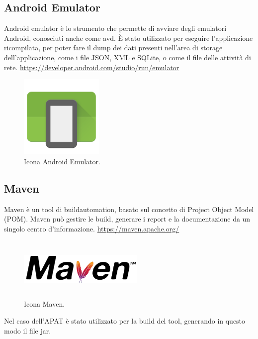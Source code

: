 \subsection*{Android Emulator}
Android emulator è lo strumento che permette di avviare degli emulatori Android, conosciuti anche come \gls{avd}.
È stato utilizzato per eseguire l'applicazione ricompilata, per poter fare il dump dei dati presenti nell'area di storage dell'applicazione, come i file JSON, XML e SQLite, o come il file delle attività di rete.
\url{https://developer.android.com/studio/run/emulator}
\begin{figure}[H]
    \centering
    \includegraphics[width=4cm, height=4cm]{./immagini/emulator.png}
    \caption{Icona Android Emulator.}\label{fig:emulator}
\end{figure}

\subsection*{Maven}
Maven è un tool di \gls{buildautomation}, basato sul concetto di Project Object Model (POM). Maven può gestire le build, generare i report e la documentazione da un singolo centro d'informazione.
\url{https://maven.apache.org/}
\begin{figure}[H]
    \centering
    \includegraphics[width=6cm, height=3cm]{./immagini/maven.png}
    \caption{Icona Maven.}\label{fig:maven}
\end{figure}
Nel caso dell'APAT è stato utilizzato per la build del tool, generando in questo modo il file jar.

